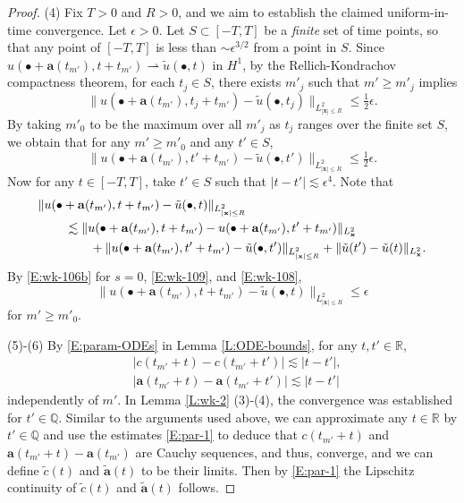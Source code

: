\documentclass[12pt,letterpaper]{amsart}
\newcommand{\indentalign}{\hspace{0.3in}&\hspace{-0.3in}}
\theoremstyle{remark}
\numberwithin{equation}{section}
\numberwithin{theorem}{section}
\numberwithin{table}{section}
\begin{document}
\begin{proof}
(4) Fix $T>0$ and $R>0$, and we aim to establish the claimed uniform-in-time convergence. Let $\epsilon>0$.   Let $S\subset [-T,T]$ be a \emph{finite} set of time points, so that any point of $[-T,T]$ is less than $\sim \epsilon^{3/2}$ from a point in $S$.    Since $u(\bullet+\mathbf{a}(t_{m'}),t+t_{m'}) \rightharpoonup \tilde u(\bullet, t)$ in $H^1$, by the Rellich-Kondrachov compactness theorem, for each $t_j\in S$, there exists $m'_j$ such that $m' \geq m'_j$ implies 
$$
\| u(\bullet+\mathbf{a}(t_{m'}),t_j+t_{m'}) - \tilde u(\bullet, t_j)\|_{L_{|\mathbf{x}|\leq R}^2} \leq \tfrac12\epsilon.
$$
By taking $m'_0$ to be the maximum over all $m'_j$ as $t_j$ ranges over the finite set $S$, we obtain that for any $m' \geq m'_0$ and any $t'\in S$,
\begin{equation}
\label{E:wk-109}
\| u(\bullet+\mathbf{a}(t_{m'}),t'+t_{m'}) - \tilde u(\bullet, t')\|_{L_{|\mathbf{x}|\leq R}^2} \leq \tfrac12\epsilon.
\end{equation}
Now for any $t\in [-T,T]$, take $t'\in S$ such that $|t-t'|\lesssim \epsilon^4$.  Note that
\begin{align*}
\indentalign \| u(\bullet+\mathbf{a}(t_{m'}),t+t_{m'}) - \tilde u(\bullet, t)\|_{L_{|\mathbf{x}|\leq R}^2} \\
& \lesssim \| u(\bullet+\mathbf{a}(t_{m'}),t+t_{m'}) -u(\bullet+\mathbf{a}(t_{m'}),t'+t_{m'})\|_{L_{\mathbf{x}}^2} \\
&\qquad +\| u(\bullet+\mathbf{a}(t_{m'}),t'+t_{m'}) - \tilde u(\bullet, t')\|_{L_{|\mathbf{x}|\leq R}^2} + \| \tilde u(t')-\tilde u(t) \|_{L_{\mathbf{x}}^2}. 
\end{align*}
By \eqref{E:wk-106b} for $s=0$, \eqref{E:wk-109}, and \eqref{E:wk-108},
$$
\| u(\bullet+\mathbf{a}(t_{m'}),t+t_{m'}) - \tilde u(\bullet, t)\|_{L_{|\mathbf{x}|\leq R}^2} \leq \epsilon$$
for $m'\geq m'_0$.

(5)-(6) By \eqref{E:param-ODEs} in Lemma \ref{L:ODE-bounds}, for any $t,t'\in \mathbb{R}$,
\begin{equation}
\label{E:par-1}
\begin{aligned}
& |c(t_{m'}+t) - c(t_{m'}+t')| \lesssim |t-t'|,\\
& |\mathbf{a}(t_{m'}+t) - \mathbf{a}(t_{m'}+t') | \lesssim |t-t'|
\end{aligned}
\end{equation}
independently of $m'$. In Lemma \ref{L:wk-2} (3)-(4), the convergence was established for $t'\in \mathbb{Q}$.  Similar to the arguments used above, we can approximate any $t\in \mathbb{R}$ by $t'\in \mathbb{Q}$ and use the estimates \eqref{E:par-1} to deduce that $c(t_{m'}+t)$ and  $\mathbf{a}(t_{m'}+t)-\mathbf{a}(t_{m'})$ are Cauchy sequences, and thus, converge, and we can define $\tilde c(t)$ and $\tilde{\mathbf{a}}(t)$ to be their limits.    Then by \eqref{E:par-1} the Lipschitz continuity of $\tilde c(t)$ and $\tilde{\mathbf{a}}(t)$ follows.
\end{proof}
\end{document}
